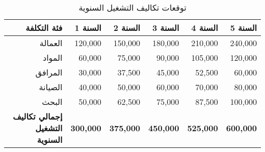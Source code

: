 \begin{table}[h]
\centering
\begin{tabular}{|r|r|r|r|r|r|}
\hline
\textbf{فئة التكلفة} & \textbf{السنة 1} & \textbf{السنة 2} & \textbf{السنة 3} & \textbf{السنة 4} & \textbf{السنة 5} \\
\hline
العمالة & 120,000 & 150,000 & 180,000 & 210,000 & 240,000 \\
المواد & 60,000 & 75,000 & 90,000 & 105,000 & 120,000 \\
المرافق & 30,000 & 37,500 & 45,000 & 52,500 & 60,000 \\
الصيانة & 40,000 & 50,000 & 60,000 & 70,000 & 80,000 \\
البحث & 50,000 & 62,500 & 75,000 & 87,500 & 100,000 \\
\hline
\textbf{إجمالي تكاليف التشغيل السنوية} & \textbf{300,000} & \textbf{375,000} & \textbf{450,000} & \textbf{525,000} & \textbf{600,000} \\
\hline
\end{tabular}
\caption{توقعات تكاليف التشغيل السنوية}
\end{table}

